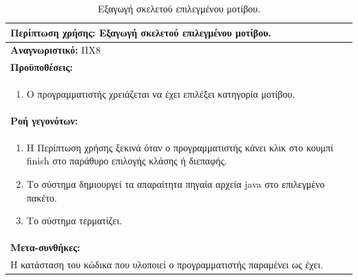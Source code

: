 \begin{table}[H]
	\hspace*{-0.2cm}
    \centering
    \scriptsize
	\begin{tabular}{|p{10cm}|}
	\hline
		\textbf{Περίπτωση χρήσης:} Εξαγωγή σκελετού επιλεγμένου μοτίβου. \\
	\hline
		\textbf{Αναγνωριστικό:} ΠΧ8 \\ 
	\hline	
		\textbf{Προϋποθέσεις:} \\
		\begin{enumerate}
		 \item Ο προγραμματιστής χρειάζεται να έχει επιλέξει κατηγορία μοτίβου.
		\end{enumerate} \\
	\hline
		\textbf{Ροή γεγονότων:} \\
		\begin{enumerate}
		 \item Η Περίπτωση χρήσης ξεκινά όταν ο προγραμματιστής κάνει κλικ στο κουμπί finish στο παράθυρο επιλογής κλάσης ή διεπαφής.
		 \item Το σύστημα δημιουργεί τα απαραίτητα πηγαία αρχεία java στο επιλεγμένο πακέτο.
		 \item Το σύστημα τερματίζει.
		\end{enumerate} \\
	\hline
		\textbf{Μετα-συνθήκες:} \\ Η κατάσταση του κώδικα που υλοποιεί ο προγραμματιστής παραμένει ως έχει. \\
	\hline
    \end{tabular}
    \caption{Εξαγωγή σκελετού επιλεγμένου μοτίβου.}
    \label{tab:createPatternUC}
\end{table}
